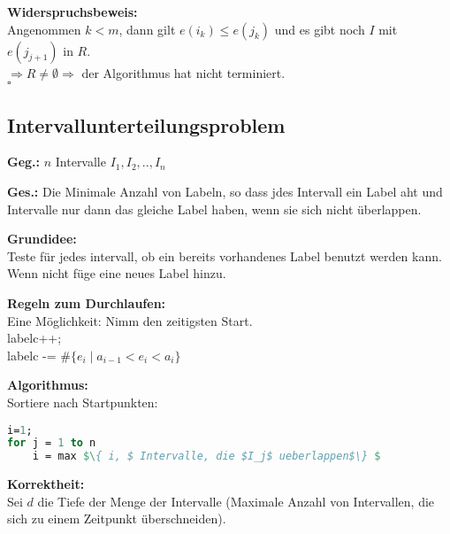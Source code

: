 \begin{description}
\begin{description}
\end{description}

\textbf{Widerspruchsbeweis:}\\
Angenommen $k<m$, dann gilt $e(i_k) \leq e(j_k)$ und es gibt noch $I$ mit $e(j_{j+1})$ in $R$.\\
$\Rightarrow R \not= \emptyset \Rightarrow$ der Algorithmus hat nicht terminiert.\\
\mbox{} \hfill $\square$

\end{description}

\subsection{Intervallunterteilungsproblem}

\begin{description}

\item{\bfseries Geg.:} $n$ Intervalle $I_1 , I_2 , .. , I_n$

\item{\bfseries Ges.:} Die Minimale Anzahl von Labeln, so dass jdes Intervall ein Label aht und Intervalle nur dann das gleiche Label haben, wenn sie sich nicht überlappen.

\item{\bfseries Grundidee:}\\
Teste für jedes intervall, ob ein bereits vorhandenes Label benutzt werden kann. Wenn nicht füge eine neues Label hinzu.

\item{\bfseries Regeln zum Durchlaufen:}\\
Eine Möglichkeit:
Nimm den zeitigsten Start.\\
labelc++;\\
labelc -= $\# \{ e_i \; | \; a_{i-1} < e_i < a_i \}$

\item{\bfseries Algorithmus:}\\
Sortiere nach Startpunkten:\\
\begin{lstlisting}[language=Pascal]
i=1;
for j = 1 to n
	i = max $\{ i, $ Intervalle, die $I_j$ ueberlappen$\} $
\end{lstlisting}

\item{\bfseries Korrektheit:}\\
Sei $d$ die Tiefe der Menge der Intervalle (Maximale Anzahl von Intervallen, die sich zu einem Zeitpunkt überschneiden).


\end{description}

